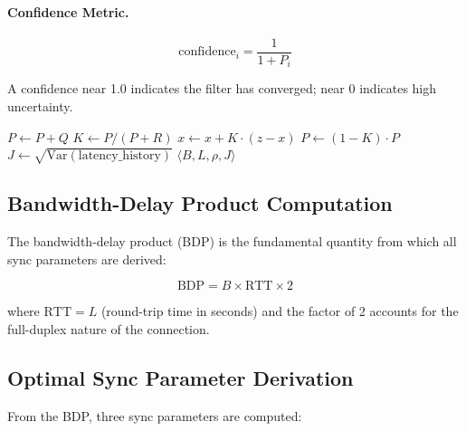 \documentclass[11pt,a4paper]{article}
\begin{document}
\paragraph{Confidence Metric.}
\begin{equation}
\text{confidence}_i = \frac{1}{1 + P_i}
\label{eq:confidence}
\end{equation}

A confidence near 1.0 indicates the filter has converged; near 0 indicates high uncertainty.

\begin{algorithm}
\caption{Kalman Network Predictor: Update Cycle}
\label{alg:kalman}
\begin{algorithmic}[1]
        \State $P \gets P + Q$ 
        \State $K \gets P / (P + R)$ 
        \State $x \gets x + K \cdot (z - x)$ 
        \State $P \gets (1 - K) \cdot P$ 
    \EndFor
    \State $J \gets \sqrt{\text{Var}(\text{latency\_history})}$ 
    \State {} 
    \State \Return $\langle B, L, \rho, J \rangle$
\EndProcedure
\end{algorithmic}
\end{algorithm}

\subsection{Bandwidth-Delay Product Computation}

The bandwidth-delay product (BDP) is the fundamental quantity from which all sync parameters are derived:

\begin{equation}
\text{BDP} = B \times \text{RTT} \times 2
\label{eq:bdp}
\end{equation}

where $\text{RTT} = L$ (round-trip time in seconds) and the factor of 2 accounts for the full-duplex nature of the connection.

\subsection{Optimal Sync Parameter Derivation}

From the BDP, three sync parameters are computed:
\end{document}
